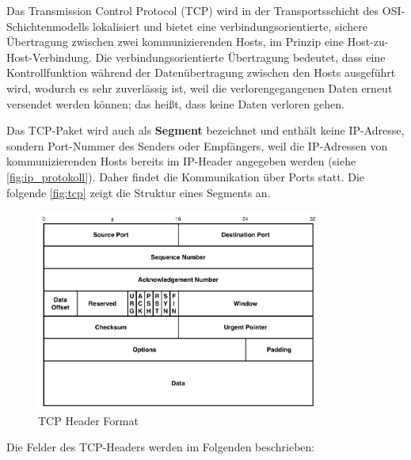 Das Transmission Control Protocol (TCP) wird in der Transportsschicht des OSI-Schichtenmodells lokalisiert und bietet eine verbindungsorientierte, sichere Übertragung zwischen zwei kommunizierenden Hosts, im Prinzip eine Host-zu-Host-Verbindung. Die verbindungsorientierte Übertragung bedeutet, dass eine Kontrollfunktion während der Datenübertragung zwischen den Hosts ausgeführt wird, wodurch es sehr zuverlässig ist, weil die verlorengegangenen Daten erneut versendet werden können; das heißt, dass keine Daten verloren gehen. \smallskip \smallskip

Das TCP-Paket wird auch als \textbf{Segment} bezeichnet und enthält keine IP-Adresse, sondern Port-Nummer des Senders oder Empfängers, weil die IP-Adressen von kommunizierenden Hosts bereits im IP-Header angegeben werden (siehe \autoref{fig:ip_protokoll}). Daher findet die Kommunikation über Ports statt. Die folgende \autoref{fig:tcp} zeigt die Struktur eines Segments an. 

\begin{figure}[htbp]
	\centering
		\includegraphics[width=356px,height=250px]{pictures/tcp.png}
	\caption[TCP Header Format]{TCP Header Format \cite{RFC:793}}\label{fig:tcp}
\end{figure}

Die Felder des TCP-Headers werden im Folgenden beschrieben:

